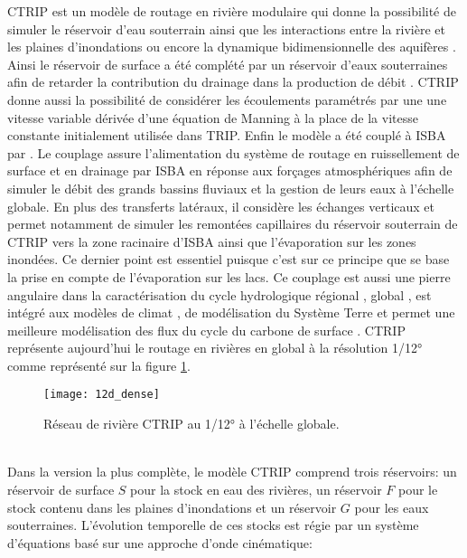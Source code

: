 CTRIP est un modèle de routage en rivière modulaire qui donne la possibilité de simuler le réservoir d'eau souterrain \citep{decharme2010} ainsi que les interactions entre la rivière et les plaines d'inondations \citep{decharme2008} ou encore la dynamique bidimensionnelle des aquifères \citep{vergnes2012}. Ainsi le réservoir de surface a été complété par un réservoir d'eaux souterraines afin de retarder la contribution du drainage dans la production de débit \citep{decharme2010}. CTRIP donne aussi la possibilité de considérer les écoulements paramétrés par une une vitesse variable dérivée d'une équation de Manning à la place de la vitesse constante initialement utilisée dans TRIP. Enfin le modèle a été couplé à ISBA par \citet{decharme2006}. Le couplage assure l'alimentation du système de routage en ruissellement de surface et en drainage par ISBA en réponse aux forçages atmosphériques afin de simuler le débit des grands bassins fluviaux et la gestion de leurs eaux à l'échelle globale. En plus des transferts latéraux, il considère les échanges verticaux et permet notamment de simuler les remontées capillaires du réservoir souterrain de CTRIP vers la zone racinaire d'ISBA ainsi que l'évaporation sur les zones inondées. Ce dernier point est essentiel puisque c'est sur ce principe que se base la prise en compte de l'évaporation sur les lacs. Ce couplage est aussi une pierre angulaire dans la caractérisation du cycle hydrologique régional \citep{decharme2008}, global \citep{alkama2010, decharme2012}, est intégré aux modèles de climat \citep{voldoire2019}, de modélisation du Système Terre \citep{seferian2019} et permet une meilleure modélisation des flux du cycle du carbone de surface \citep{delire2020}. CTRIP représente aujourd'hui le routage en rivières en global à la résolution 1/12° comme représenté sur la figure \ref{12d_globe}.\\

\begin{figure}[h!]
 \centering
 \texttt{[image: 12d\_dense]}
 \caption{Réseau de rivière CTRIP au 1/12° à l'échelle globale.}
 \label{12d_globe}
\end{figure}

~\\

Dans la version la plus complète, le modèle CTRIP comprend trois réservoirs: un réservoir de surface $S$ pour la stock en eau des rivières, un réservoir $F$ pour le stock contenu dans les plaines d'inondations et un réservoir $G$ pour les eaux souterraines. L'évolution temporelle de ces stocks est régie par un système d'équations basé sur une approche d'onde cinématique:\\


